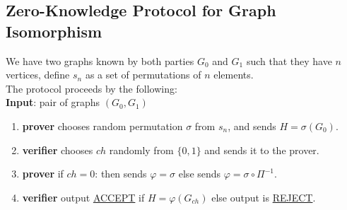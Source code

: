 \documentclass[12pt,a4paper]{article}
\begin{document}
\subsection{ Zero-Knowledge Protocol for Graph Isomorphism}
We have two graphs known by both parties $G_0$ and $G_1$ such that they have $n$ vertices, define $s_n$ as a set of permutations of $n$ elements.\\   
The protocol proceeds by the following:\cite{lec-notes1:3}\\
\textbf{Input}: pair of graphs $(G_0,G_1)$
\begin{enumerate}	
	\item
	\begin{enumerate}
\textbf{prover} chooses random permutation $\sigma$ from $s_n$, and sends $H=\sigma(G_0)$.
\end{enumerate}
	\item
\begin{enumerate}
\textbf{verifier}  chooses $ch$ randomly from $\{0,1\}$ and sends it to the prover.
\end{enumerate}
	\item
\begin{enumerate}
\textbf{prover} if $ch=0$: then sends $\varphi=\sigma$ else sends $\varphi=\sigma \circ \Pi^{-1}$.
\end{enumerate}
	\item
\begin{enumerate}
\textbf{verifier} output \underline{ACCEPT} if $H=\varphi(G_{ch})$ else output is \underline{REJECT}.\\

\end{enumerate}
\end{enumerate}
\end{document}
